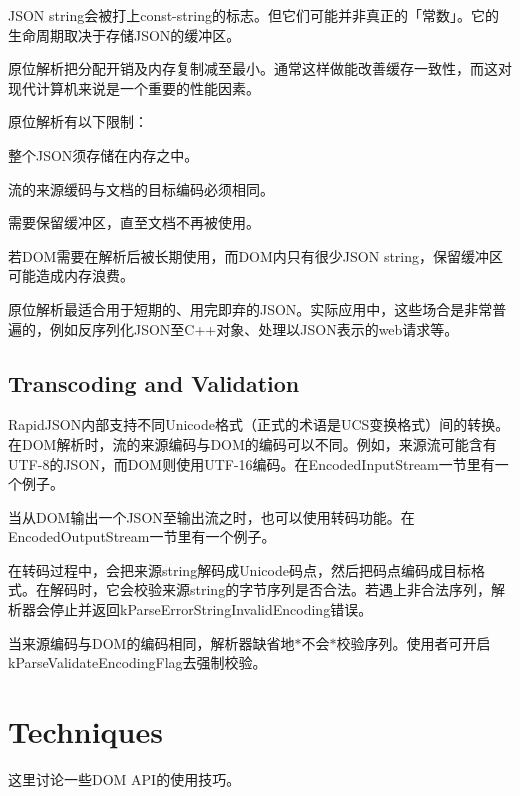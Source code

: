 J\+S\+ON string会被打上const-\/string的标志。但它们可能并非真正的「常数」。它的生命周期取决于存储\+J\+S\+O\+N的缓冲区。

原位解析把分配开销及内存复制减至最小。通常这样做能改善缓存一致性，而这对现代计算机来说是一个重要的性能因素。

原位解析有以下限制：


\begin{DoxyEnumerate}
\item 整个\+J\+S\+O\+N须存储在内存之中。
\item 流的来源缓码与文档的目标编码必须相同。
\item 需要保留缓冲区，直至文档不再被使用。
\item 若\+D\+O\+M需要在解析后被长期使用，而\+D\+O\+M内只有很少\+J\+S\+ON string，保留缓冲区可能造成内存浪费。
\end{DoxyEnumerate}

原位解析最适合用于短期的、用完即弃的\+J\+S\+O\+N。实际应用中，这些场合是非常普遍的，例如反序列化\+J\+S\+O\+N至\+C++对象、处理以\+J\+S\+O\+N表示的web请求等。\hypertarget{md_Commun_Externe_RapidJSON_doc_dom.zh-cn_TranscodingAndValidation}{}\subsection{Transcoding and Validation}\label{md_Commun_Externe_RapidJSON_doc_dom.zh-cn_TranscodingAndValidation}
Rapid\+J\+S\+O\+N内部支持不同\+Unicode格式（正式的术语是\+U\+C\+S变换格式）间的转换。在\+D\+O\+M解析时，流的来源编码与\+D\+O\+M的编码可以不同。例如，来源流可能含有\+U\+T\+F-\/8的\+J\+S\+O\+N，而\+D\+O\+M则使用\+U\+T\+F-\/16编码。在Encoded\+Input\+Stream一节里有一个例子。

当从\+D\+O\+M输出一个\+J\+S\+O\+N至输出流之时，也可以使用转码功能。在Encoded\+Output\+Stream一节里有一个例子。

在转码过程中，会把来源string解码成\+Unicode码点，然后把码点编码成目标格式。在解码时，它会校验来源string的字节序列是否合法。若遇上非合法序列，解析器会停止并返回{\ttfamily k\+Parse\+Error\+String\+Invalid\+Encoding}错误。

当来源编码与\+D\+O\+M的编码相同，解析器缺省地$\ast$不会$\ast$校验序列。使用者可开启{\ttfamily k\+Parse\+Validate\+Encoding\+Flag}去强制校验。\hypertarget{md_Commun_Externe_RapidJSON_doc_sax.zh-cn_Techniques}{}\section{Techniques}\label{md_Commun_Externe_RapidJSON_doc_sax.zh-cn_Techniques}
这里讨论一些\+D\+OM A\+P\+I的使用技巧。

